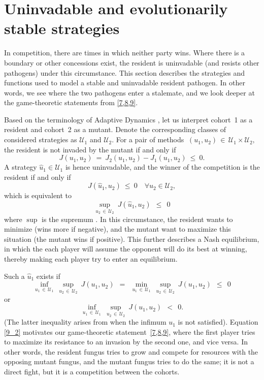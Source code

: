 \documentclass[11pt]{amsart}
\begin{document}
\section{Uninvadable and evolutionarily stable strategies}
In competition, there are times in which neither party wins. Where there is a boundary or other concessions exist, the resident is uninvadable (and resists other pathogens) under this circumstance. This section describes the strategies and functions used to model a stable and uninvadable resident pathogen. In other words, we see where the two pathogens enter a stalemate, and we look deeper at the game-theoretic statements from {\rm \cref{7,8,9}}.

Based on the terminology of Adaptive Dynamics \cite{DercoleRinaldi2008}, let
us interpret cohort~{\rm 1} as a resident and cohort~{\rm 2} as a mutant.
Denote the corresponding classes of considered strategies as $ \mathcal{U}_1 $
and $ \mathcal{U}_2 $. For a pair of methods
$ \: (u_1, u_2) \, \in \, \mathcal{U}_1 \times \mathcal{U}_2, \: $
the resident is not invaded by the mutant if and only if
$$
J(u_1, u_2) \: = \: J_2(u_1, u_2) - J_1(u_1, u_2) \: \leqslant \: 0.
$$
A strategy 
$ \hat{u}_1 \in \mathcal{U}_1 $
is hence uninvadable, and the winner of the competition is the resident if and only if
$$
J \left( \hat{u}_1, u_2 \right) \: \leqslant \: 0 \quad \forall u_2 \in
  \mathcal{U}_2,
$$
which is equivalent to
$$
\sup_{u_2 \, \in \, \mathcal{U}_2} \: J \left( \hat{u}_1, u_2 \right) \:\:
  \leqslant \:\: 0
$$
where $\sup$ is the supremum . In this circumstance, the resident wants to minimize (wins more if negative), and the mutant want to maximize this situation (the mutant wins if positive). This further describes a Nash equilibrium, in which the each player will assume the opponent will do its best at winning, thereby making each player try to enter an equilibrium.


Such a $ \hat{u}_1 $ exists if
\begin{equation}
\inf_{u_1 \, \in \, \mathcal{U}_1} \: \sup_{u_2 \, \in \, \mathcal{U}_2} \:
  J(u_1, u_2) \:\: = \:\:
\min_{u_1 \, \in \, \mathcal{U}_1} \: \sup_{u_2 \, \in \, \mathcal{U}_2} \:
  J(u_1, u_2) \:\: \leqslant \:\: 0  \label{9_2}
\end{equation}
or
\begin{equation}
\inf_{u_1 \, \in \, \mathcal{U}_1} \: \sup_{u_2 \, \in \, \mathcal{U}_2} \:
  J(u_1, u_2) \:\: < \:\: 0  \label{9_4}.
\end{equation}
(The latter inequality arises from when the infimum $u_1$ is not satisfied).
Equation \cref{9_2} motivates our game-theoretic statement~{\rm \cref{7,8,9},}
where the first player tries to maximize its resistance to an invasion by the
second one{\rm ,} and vice versa. In other words, the resident fungus tries to grow and compete for resources with the opposing mutant fungus, and the mutant fungus tries to do the same; it is not a direct fight, but it is a competition between the cohorts.
\end{document}
